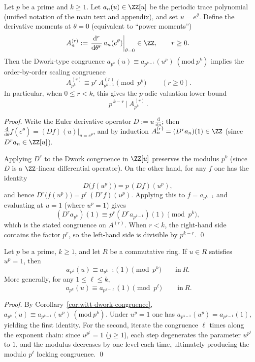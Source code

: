 \begin{proposition}\label{prop:witt-theta-derivative-filter}
Let \(p\) be a prime and \(k\ge 1\). Let \(a_n(u)\in\ZZ[u]\) be the periodic trace polynomial (unified notation of the main text and appendix), and set \(u=e^\theta\).
Define the derivative moments at \(\theta=0\) (equivalent to ``power moments'')
$$
A_{n}^{(r)}:=\left.\frac{\mathrm{d}^r}{\mathrm{d}\theta^r}\,a_n(e^\theta)\right|_{\theta=0}\in\ZZ,\qquad r\ge 0.
$$
Then the Dwork-type congruence \(a_{p^k}(u)\equiv a_{p^{k-1}}(u^p)\ (\mathrm{mod}\ p^k)\) implies the order-by-order scaling congruence
$$
\boxed{\ A_{p^k}^{(r)}\equiv p^r\,A_{p^{k-1}}^{(r)}\pmod{p^k}\ }\qquad(r\ge 0).
$$
In particular, when \(0\le r<k\), this gives the \(p\)-adic valuation lower bound
$$
\boxed{\ p^{\,k-r}\ \big|\ A_{p^k}^{(r)}\ }.
$$
\end{proposition}
\begin{proof}
Write the Euler derivative operator \(D:=u\,\frac{\mathrm{d}}{\mathrm{d}u}\); then
\(
\frac{\mathrm{d}}{\mathrm{d}\theta}f(e^\theta)=(Df)(u)\big|_{u=e^\theta}
\),
and by induction
\(
A_n^{(r)}=(D^r a_n)(1)\in\ZZ
\) (since \(D^r a_n\in\ZZ[u]\)).
\par
Applying \(D^r\) to the Dwork congruence in \(\ZZ[u]\) preserves the modulus \(p^k\) (since \(D\) is a \(\ZZ\)-linear differential operator).
On the other hand, for any \(f\) one has the identity
$$
D\bigl(f(u^p)\bigr)=p\,(Df)(u^p),
$$
and hence \(D^r\bigl(f(u^p)\bigr)=p^r\,(D^r f)(u^p)\).
Applying this to \(f=a_{p^{k-1}}\) and evaluating at \(u=1\) (where \(u^p=1\)) gives
$$
(D^r a_{p^k})(1)\equiv p^r (D^r a_{p^{k-1}})(1)\pmod{p^k},
$$
which is the stated congruence on \(A^{(r)}\).
When \(r<k\), the right-hand side contains the factor \(p^r\), so the left-hand side is divisible by \(p^{k-r}\). \qed
\end{proof}

\begin{corollary}[Tower-locking at \texorpdfstring{$u^p=1$}{u^p=1}: twisted traces are pushed back to the untwisted level]\label{cor:witt-root-of-unity-tower-lock}
Let \(p\) be a prime, \(k\ge 1\), and let \(R\) be a commutative ring. If \(u\in R\) satisfies \(u^p=1\), then
\[
a_{p^k}(u)\equiv a_{p^{k-1}}(1)\pmod{p^k}\qquad\text{in}\ R.
\]
More generally, for any \(1\le \ell\le k\),
\[
\boxed{\ a_{p^k}(u)\equiv a_{p^{k-\ell}}(1)\pmod{p^\ell}\ }\qquad\text{in}\ R.
\]
\end{corollary}
\begin{proof}
By Corollary~\ref{cor:witt-dwork-congruence},
\(
a_{p^k}(u)\equiv a_{p^{k-1}}(u^p)\ (\mathrm{mod}\ p^k)
\).
Under \(u^p=1\) one has \(a_{p^{k-1}}(u^p)=a_{p^{k-1}}(1)\), yielding the first identity.
For the second, iterate the congruence \(\ell\) times along the exponent chain: since \(u^{p^j}=1\) (\(j\ge 1\)), each step degenerates the parameter \(u^{p^j}\) to \(1\), and the modulus decreases by one level each time, ultimately producing the modulo \(p^\ell\) locking congruence. \qed
\end{proof}

